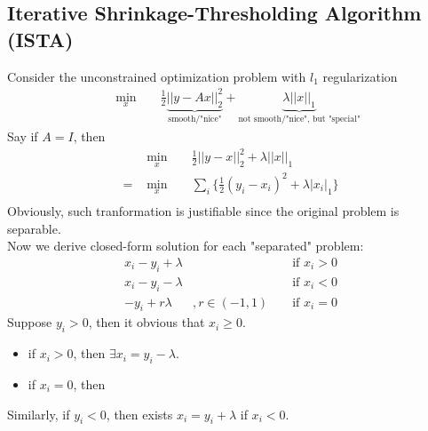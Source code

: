 \documentclass[12pt]{report}
\begin{document}
\subsection{Iterative Shrinkage-Thresholding Algorithm (ISTA)}
Consider the unconstrained optimization problem with $l_1$ regularization
\begin{equation}
\begin{aligned}
    & \underset{x}{\text{ min }}
    && \frac{1}{2}\underbrace{|| y - Ax ||_2^2}_{\text{smooth/"nice"}}
    + \underbrace{  \lambda || x ||_1 }_{\text{not smooth/"nice", but "special"}}
\end{aligned}
\end{equation}
Say if $A = I$, then
\begin{equation}
\begin{aligned}
    & \underset{x}{\text{ min }} 
    && \frac{1}{2} || y - x ||_2^2 + \lambda || x ||_1 \\
    = 
    & \underset{x}{\text{ min }} 
    && \sum_i \{ \frac{1}{2} ( y_i - x_i )^2  + \lambda | x_i |_1 \} \\
\end{aligned}
\end{equation}
Obviously, such tranformation is justifiable since the original problem is
separable. \\
Now we derive closed-form solution for each "separated" problem: 
\begin{align}
    x_i-y_i + \lambda & && \text{ if } x_i > 0 \\
    x_i-y_i - \lambda & && \text{ if } x_i < 0 \\
    -y_i + r \lambda &, r \in (-1,1) && \text{ if } x_i = 0 
\end{align}
Suppose $y_i > 0$, then it obvious that $x_i \geq 0 $. 
\begin{itemize}
    \item if $x_i > 0$, then $\exists x_i = y_i - \lambda$.
    \item if $x_i = 0$, then 
\end{itemize}
Similarly, if $y_i < 0$, then exists $x_i = y_i + \lambda$ if $x_i < 0$.
\end{document}
